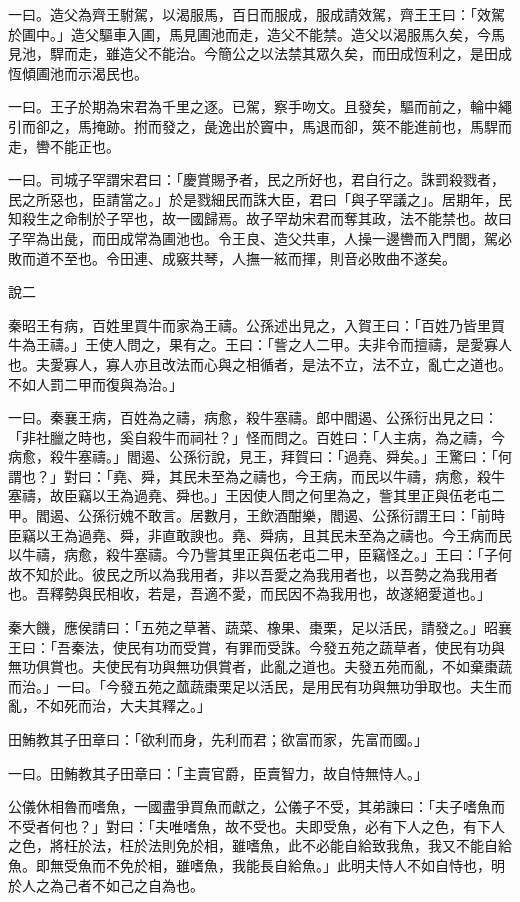 \begin{pinyinscope}
一曰。造父為齊王駙駕，以渴服馬，百日而服成，服成請效駕，齊王王曰：「效駕於圃中。」造父驅車入圃，馬見圃池而走，造父不能禁。造父以渴服馬久矣，今馬見池，駻而走，雖造父不能治。今簡公之以法禁其眾久矣，而田成恆利之，是田成恆傾圃池而示渴民也。

一曰。王子於期為宋君為千里之逐。已駕，察手吻文。且發矣，驅而前之，輪中繩引而卻之，馬掩跡。拊而發之，彘逸出於竇中，馬退而卻，筴不能進前也，馬駻而走，轡不能正也。

一曰。司城子罕謂宋君曰：「慶賞賜予者，民之所好也，君自行之。誅罰殺戮者，民之所惡也，臣請當之。」於是戮細民而誅大臣，君曰「與子罕議之」。居期年，民知殺生之命制於子罕也，故一國歸焉。故子罕劫宋君而奪其政，法不能禁也。故曰子罕為出彘，而田成常為圃池也。令王良、造父共車，人操一邊轡而入門閭，駕必敗而道不至也。令田連、成竅共琴，人撫一絃而揮，則音必敗曲不遂矣。

說二

秦昭王有病，百姓里買牛而家為王禱。公孫述出見之，入賀王曰：「百姓乃皆里買牛為王禱。」王使人問之，果有之。王曰：「訾之人二甲。夫非令而擅禱，是愛寡人也。夫愛寡人，寡人亦且改法而心與之相循者，是法不立，法不立，亂亡之道也。不如人罰二甲而復與為治。」

一曰。秦襄王病，百姓為之禱，病愈，殺牛塞禱。郎中閻遏、公孫衍出見之曰：「非社臘之時也，奚自殺牛而祠社？」怪而問之。百姓曰：「人主病，為之禱，今病愈，殺牛塞禱。」閻遏、公孫衍說，見王，拜賀曰：「過堯、舜矣。」王驚曰：「何謂也？」對曰：「堯、舜，其民未至為之禱也，今王病，而民以牛禱，病愈，殺牛塞禱，故臣竊以王為過堯、舜也。」王因使人問之何里為之，訾其里正與伍老屯二甲。閻遏、公孫衍媿不敢言。居數月，王飲酒酣樂，閻遏、公孫衍謂王曰：「前時臣竊以王為過堯、舜，非直敢諛也。堯、舜病，且其民未至為之禱也。今王病而民以牛禱，病愈，殺牛塞禱。今乃訾其里正與伍老屯二甲，臣竊怪之。」王曰：「子何故不知於此。彼民之所以為我用者，非以吾愛之為我用者也，以吾勢之為我用者也。吾釋勢與民相收，若是，吾適不愛，而民因不為我用也，故遂絕愛道也。」

秦大饑，應侯請曰：「五苑之草著、蔬菜、橡果、棗栗，足以活民，請發之。」昭襄王曰：「吾秦法，使民有功而受賞，有罪而受誅。今發五苑之蔬草者，使民有功與無功俱賞也。夫使民有功與無功俱賞者，此亂之道也。夫發五苑而亂，不如棄棗蔬而治。」一曰。「今發五苑之蓏蔬棗栗足以活民，是用民有功與無功爭取也。夫生而亂，不如死而治，大夫其釋之。」

田鮪教其子田章曰：「欲利而身，先利而君；欲富而家，先富而國。」

一曰。田鮪教其子田章曰：「主賣官爵，臣賣智力，故自恃無恃人。」

公儀休相魯而嗜魚，一國盡爭買魚而獻之，公儀子不受，其弟諫曰：「夫子嗜魚而不受者何也？」對曰：「夫唯嗜魚，故不受也。夫即受魚，必有下人之色，有下人之色，將枉於法，枉於法則免於相，雖嗜魚，此不必能自給致我魚，我又不能自給魚。即無受魚而不免於相，雖嗜魚，我能長自給魚。」此明夫恃人不如自恃也，明於人之為己者不如己之自為也。


\end{pinyinscope}
